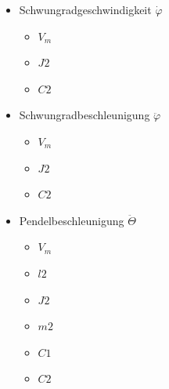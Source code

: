 \begin{minipage}[t]{.5\textwidth}
    \begin{itemize}
        \item Schwungradgeschwindigkeit $\dot\varphi$
        \begin{itemize}
            \item $V_m$
            \item $J2$
            \item $C2$
        \end{itemize}
        \item Schwungradbeschleunigung $\ddot\varphi$
        \begin{itemize}
            \item $V_m$
            \item $J2$
            \item $C2$
        \end{itemize}
        \item Pendelbeschleunigung $\ddot\Theta$
        \begin{itemize}
            \item $V_m$
            \item $l2$
            \item $J2$
            \item $m2$
            \item $C1$
            \item $C2$
        \end{itemize}
        \end{itemize}
\end{minipage}
